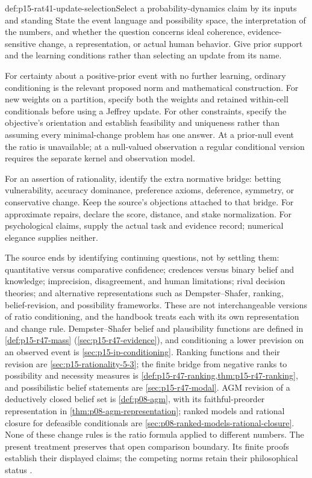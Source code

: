 \begin{hbmethod}{def:p15-rat41-update-selection}{Select a probability-dynamics claim by its inputs and standing}
State the event language and possibility space, the interpretation of
the numbers, and whether the question concerns ideal coherence,
evidence-sensitive change, a representation, or actual human behavior.
Give prior support and the learning conditions rather than selecting an
update from its name.

For certainty about a positive-prior event with no further learning,
ordinary conditioning is the relevant proposed norm and mathematical
construction. For new weights on a partition, specify both the weights
and retained within-cell conditionals before using a Jeffrey update.
For other constraints, specify the objective's orientation and establish
feasibility and uniqueness rather than assuming every minimal-change
problem has one answer. At a prior-null event the ratio is unavailable;
at a null-valued observation a regular conditional version requires
the separate kernel and observation model.

For an assertion of rationality, identify the extra normative bridge:
betting vulnerability, accuracy dominance, preference axioms, deference,
symmetry, or conservative change. Keep the source's objections attached
to that bridge. For approximate repairs, declare the score, distance,
and stake normalization. For psychological claims, supply the actual
task and evidence record; numerical elegance supplies neither.
\end{hbmethod}

The source ends by identifying continuing questions, not by settling
them: quantitative versus comparative confidence; credences versus
binary belief and knowledge; imprecision, disagreement, and human
limitations; rival decision theories; and alternative representations
such as Dempster--Shafer, ranking, belief-revision, and possibility
frameworks. These are not interchangeable versions of ratio conditioning,
and the handbook treats each with its own representation and change rule.
Dempster--Shafer belief and plausibility functions are defined in
\cref{def:p15-r47-mass} (\cref{sec:p15-r47-evidence}), and conditioning a
lower prevision on an observed event is \cref{sec:p15-ip-conditioning}.
Ranking functions and their revision are \cref{sec:p15-rationality-5-3};
the finite bridge from negative ranks to possibility and necessity measures
is \cref{def:p15-r47-ranking,thm:p15-r47-ranking}, and possibilistic belief
statements are \cref{sec:p15-r47-modal}. AGM revision of a deductively
closed belief set is \cref{def:p08-agm}, with its faithful-preorder
representation in \cref{thm:p08-agm-representation}; ranked models and
rational closure for defeasible conditionals are
\cref{sec:p08-ranked-models-rational-closure}. None of these change rules
is the ratio formula applied to different numbers.
The present treatment preserves that open comparison boundary. Its finite
proofs establish their displayed claims; the competing norms retain
their philosophical status
\parencite[pp.~247--251]{HajekStaffel2021Dynamics}.

